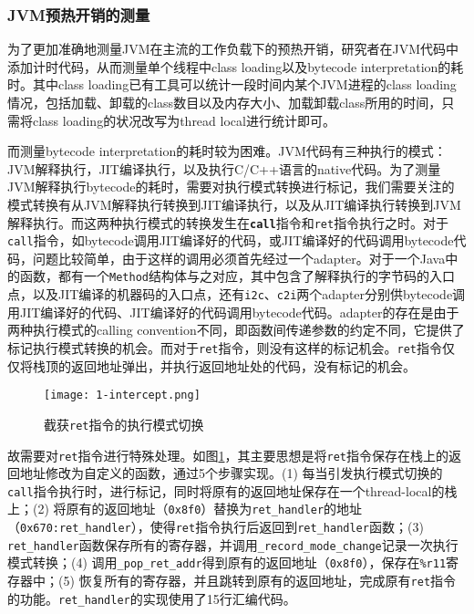 \documentclass[lang=cn,12pt,a4paper,cite=authoryear]{elegantpaper}
\begin{document}
\subsubsection{JVM预热开销的测量}
为了更加准确地测量JVM在主流的工作负载下的预热开销，研究者在JVM代码中添加计时代码，从而测量单个线程中class loading以及bytecode interpretation的耗时。其中class loading已有工具可以统计一段时间内某个JVM进程的class loading情况，包括加载、卸载的class数目以及内存大小、加载卸载class所用的时间，只需将class loading的状况改写为thread local进行统计即可。

而测量bytecode interpretation的耗时较为困难。JVM代码有三种执行的模式：JVM解释执行，JIT编译执行，以及执行C/C++语言的native代码。为了测量JVM解释执行bytecode的耗时，需要对执行模式转换进行标记，我们需要关注的模式转换有从JVM解释执行转换到JIT编译执行，以及从JIT编译执行转换到JVM解释执行。而这两种执行模式的转换发生在\textbf{\texttt{call}}指令和\texttt{ret}指令执行之时。对于\texttt{call}指令，如bytecode调用JIT编译好的代码，或JIT编译好的代码调用bytecode代码，问题比较简单，由于这样的调用必须首先经过一个adapter。对于一个Java中的函数，都有一个\texttt{Method}结构体与之对应，其中包含了解释执行的字节码的入口点，以及JIT编译的机器码的入口点，还有\texttt{i2c}、\texttt{c2i}两个adapter分别供bytecode调用JIT编译好的代码、JIT编译好的代码调用bytecode代码。adapter的存在是由于两种执行模式的calling convention不同，即函数间传递参数的约定不同，它提供了标记执行模式转换的机会。而对于\texttt{ret}指令，则没有这样的标记机会。\texttt{ret}指令仅仅将栈顶的返回地址弹出，并执行返回地址处的代码，没有标记的机会。

\begin{figure}[!htp]
  \centering
  \texttt{[image: 1-intercept.png]}
  \caption{截获\texttt{ret}指令的执行模式切换}
  \label{fig:intercept}
\end{figure}

故需要对\texttt{ret}指令进行特殊处理。如图\ref{fig:intercept}，其主要思想是将\texttt{ret}指令保存在栈上的返回地址修改为自定义的函数，通过5个步骤实现。(1) 每当引发执行模式切换的\texttt{call}指令执行时，进行标记，同时将原有的返回地址保存在一个thread-local的栈上；(2) 将原有的返回地址（\texttt{0x8f0}）替换为\texttt{ret\_handler}的地址（\texttt{0x670:ret\_handler}），使得\texttt{ret}指令执行后返回到\texttt{ret\_handler}函数；(3) \texttt{ret\_handler}函数保存所有的寄存器，并调用\texttt{\_record\_mode\_change}记录一次执行模式转换；(4) 调用\texttt{\_pop\_ret\_addr}得到原有的返回地址（\texttt{0x8f0}），保存在\texttt{\%r11}寄存器中；(5) 恢复所有的寄存器，并且跳转到原有的返回地址，完成原有\texttt{ret}指令的功能。\texttt{ret\_handler}的实现使用了15行汇编代码。
\end{document}
